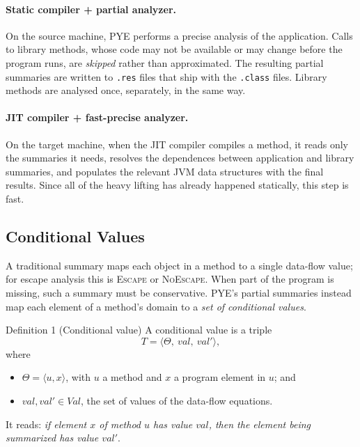 \paragraph{Static compiler + partial analyzer.} On the source machine, PYE performs a precise
analysis of the application. Calls to library methods, whose code may not be available or may
change before the program runs, are \emph{skipped} rather than approximated. The resulting
partial summaries are written to \texttt{.res} files that ship with the \texttt{.class} files.
Library methods are analysed once, separately, in the same way.

\paragraph{JIT compiler + fast-precise analyzer.} On the target machine, when the JIT compiler
compiles a method, it reads only the summaries it needs, resolves the dependences between
application and library summaries, and populates the relevant JVM data structures with the final
results. Since all of the heavy lifting has already happened statically, this step is fast.

\subsection{Conditional Values}

A traditional summary maps each object in a method to a single data-flow value; for escape
analysis this is \textsc{Escape} or \textsc{NoEscape}. When part of the program is missing, such
a summary must be conservative. PYE's partial summaries instead map each element of a method's
domain to a \emph{set of conditional values}.

\begin{defbox}{Definition 1 (Conditional value)}
A conditional value is a triple
\[ T = \langle \Theta,\ \mathit{val},\ \mathit{val}' \rangle, \]
where
\begin{itemize}
  \item $\Theta = \langle u, x \rangle$, with $u$ a method and $x$ a program element in $u$; and
  \item $\mathit{val}, \mathit{val}' \in \mathit{Val}$, the set of values of the data-flow equations.
\end{itemize}
It reads: \emph{if element $x$ of method $u$ has value $\mathit{val}$, then the element being
summarized has value $\mathit{val}'$}.
\end{defbox}


